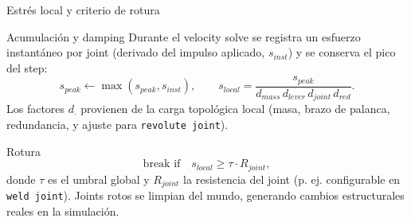 \documentclass[aspectratio=169,11pt]{beamer}
\begin{document}
\begin{frame}{Estrés local y criterio de rotura}
  \begin{block}{Acumulación y damping}
    Durante el velocity solve se registra un esfuerzo instantáneo por joint (derivado del impulso aplicado, $s_{inst}$) y se conserva el pico del step:
    \[
      s_{peak} \leftarrow \max(s_{peak}, s_{inst}), \qquad
      s_{local} = \frac{s_{peak}}{d_{mass}\, d_{lever}\, d_{joint}\, d_{red}}.
    \]
    Los factores $d_{\cdot}$ provienen de la carga topológica local (masa, brazo de palanca, redundancia, y ajuste para \texttt{revolute joint}).
  \end{block}

  \begin{block}{Rotura}
    \[
      \text{break if}\quad s_{local} \ge \tau \cdot R_{joint},
    \]
    donde $\tau$ es el umbral global y $R_{joint}$ la resistencia del joint (p. ej. configurable en \texttt{weld joint}).
    Joints rotos se limpian del mundo, generando cambios estructurales reales en la simulación.
  \end{block}
\end{frame}
\end{document}

